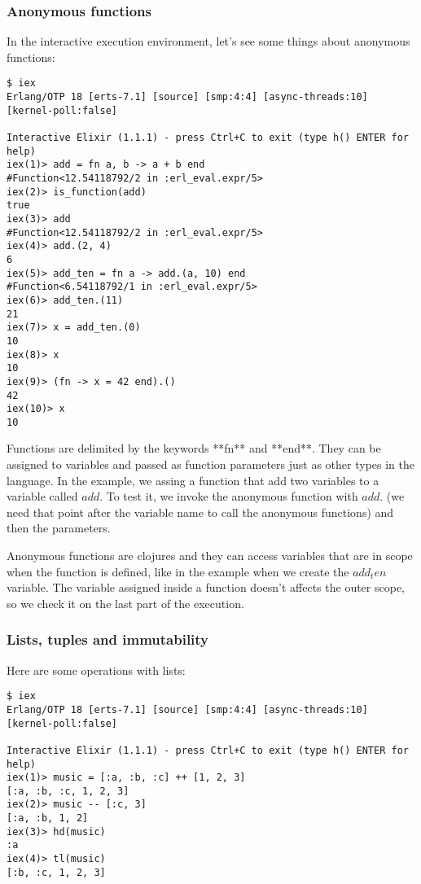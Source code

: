 \subsubsection{Anonymous functions}

In the interactive execution environment, let's see some things about anonymous
functions:

\begin{verbatim}
$ iex
Erlang/OTP 18 [erts-7.1] [source] [smp:4:4] [async-threads:10] [kernel-poll:false]

Interactive Elixir (1.1.1) - press Ctrl+C to exit (type h() ENTER for help)
iex(1)> add = fn a, b -> a + b end
#Function<12.54118792/2 in :erl_eval.expr/5>
iex(2)> is_function(add)
true
iex(3)> add
#Function<12.54118792/2 in :erl_eval.expr/5>
iex(4)> add.(2, 4)
6
iex(5)> add_ten = fn a -> add.(a, 10) end
#Function<6.54118792/1 in :erl_eval.expr/5>
iex(6)> add_ten.(11)
21
iex(7)> x = add_ten.(0)
10
iex(8)> x
10
iex(9)> (fn -> x = 42 end).()
42
iex(10)> x
10
\end{verbatim}

Functions are delimited by the keywords **fn** and **end**. They can be assigned
to variables and passed as function parameters just as other types in the
language. In the example, we assing a function that add two variables to a
variable called $add$. To test it, we invoke the anonymous function with $add.$
(we need that point after the variable name to call the anonymous functions) and
then the parameters.

Anonymous functions are clojures and they can access variables that are in scope
when the function is defined, like in the example when we create the $add_ten$
variable. The variable assigned inside a function doesn't affects the outer
scope, so we check it on the last part of the execution.

\subsubsection{Lists, tuples and immutability}

Here are some operations with lists:

\begin{verbatim}
$ iex
Erlang/OTP 18 [erts-7.1] [source] [smp:4:4] [async-threads:10] [kernel-poll:false]

Interactive Elixir (1.1.1) - press Ctrl+C to exit (type h() ENTER for help)
iex(1)> music = [:a, :b, :c] ++ [1, 2, 3]
[:a, :b, :c, 1, 2, 3]
iex(2)> music -- [:c, 3]
[:a, :b, 1, 2]
iex(3)> hd(music)
:a
iex(4)> tl(music)
[:b, :c, 1, 2, 3]
\end{verbatim}


